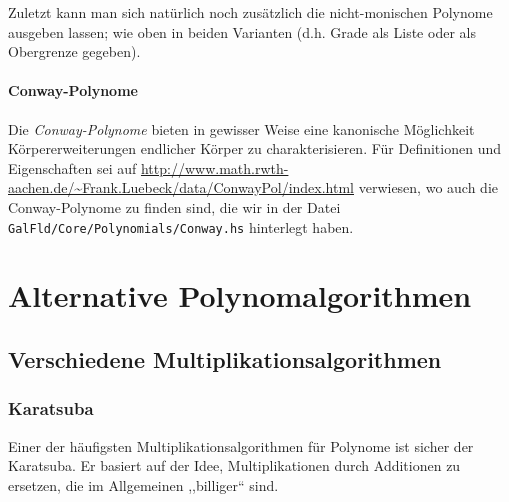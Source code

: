 
Zuletzt kann man sich natürlich noch zusätzlich die nicht-monischen Polynome
ausgeben lassen; wie oben in beiden Varianten (d.h. Grade als Liste oder als
Obergrenze gegeben).


\paragraph{Conway-Polynome}
Die \emph{Conway-Polynome} bieten in gewisser Weise eine kanonische Möglichkeit
Körpererweiterungen endlicher Körper zu charakterisieren. Für Definitionen
und Eigenschaften sei auf
\url{http://www.math.rwth-aachen.de/~Frank.Luebeck/data/ConwayPol/index.html}
verwiesen, wo auch die Conway-Polynome zu finden sind, die wir in der Datei
\texttt{GalFld/Core/Polynomials/Conway.hs} hinterlegt haben.




\section{Alternative Polynomalgorithmen}
\subsection{Verschiedene Multiplikationsalgorithmen}
\label{subsec:multAlgs}

\subsubsection{Karatsuba}
Einer der häufigsten Multiplikationsalgorithmen für Polynome ist sicher der
Karatsuba. Er basiert auf der Idee, Multiplikationen durch Additionen zu
ersetzen, die im Allgemeinen ,,billiger`` sind. 

